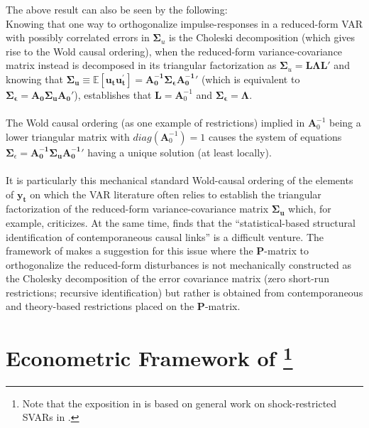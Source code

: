 \documentclass[a4paper,11pt,listof=nochaptergap,oneside,pointednumbers,bibtotoc,bigheadings,liststotoc,hidelinks]{scrbook}
\theoremstyle{mysatz}
\theoremstyle{mydefinition}
\theoremstyle{mytheorem}
\theoremstyle{mybemerkung}
\newcommand{\vect}[1]{\boldsymbol{\mathbf{#1}}}
\begin{document}
The above result can also be seen by the following:\\
Knowing that one way to orthogonalize impulse-responses in a reduced-form VAR with possibly correlated errors in $\vect{\Sigma}_u$ is the Choleski decomposition (which gives rise to the Wold causal ordering), when the reduced-form variance-covariance matrix instead is decomposed in its triangular factorization as $\vect{\Sigma}_u = \vect{L}\vect{\Lambda}\vect{L}'$ and knowing that $\vect{\Sigma_u}  \equiv \mathbb{E}[\vect{u_t}\vect{u_t^'}]= \vect{A_0^{-1}}\vect{\Sigma_\epsilon}\vect{A_0^{-1}}'$ (which is equivalent to $\vect{\Sigma_\epsilon} = \vect{A_0}\vect{\Sigma_u}\vect{A_0}'$), establishes that $\vect{L} = \vect{A}_0^{-1}$ and $\vect{\Sigma_\epsilon} = \vect{\Lambda}$. 
\\
\\
The Wold causal ordering (as one example of restrictions) implied in $\vect{A}_0^{-1}$ being a lower triangular matrix with $diag(\vect{A}_0^{-1}) = 1$ causes the system of equations $\vect{\Sigma}_\epsilon  = \vect{A_0^{-1}}\vect{\Sigma_u}\vect{A_0^{-1}}'$ having a unique solution (at least locally).
\\
\\
It is particularly this mechanical standard Wold-causal ordering of the elements of $\vect{y_t}$ on which the VAR literature often relies to establish the triangular factorization of the reduced-form variance-covariance matrix $\vect{\Sigma_u}$ which, for example, \citet{jorda:05} criticizes. At the same time, \citet[p. 4]{jorda:05} finds that the ``statistical-based structural identification of contemporaneous causal links'' is a difficult venture. The framework of \citet{ludvigsonetal:18} makes a suggestion for this issue where the $\vect{P}$-matrix to orthogonalize the reduced-form disturbances is not mechanically constructed as the Cholesky decomposition of the error covariance matrix (zero short-run restrictions; recursive identification) but rather is obtained from contemporaneous and theory-based restrictions placed on the $\vect{P}$-matrix.


\section[Econometric Framework of \citet{ludvigsonetal:18}]{Econometric Framework of \citet{ludvigsonetal:18}\footnote{Note that the exposition in \citet{ludvigsonetal:18} is based on general work on shock-restricted SVARs in \citet{ludvigsonetal:17}.}}
\label{sec:econometricframeworkLMN}
\end{document}
